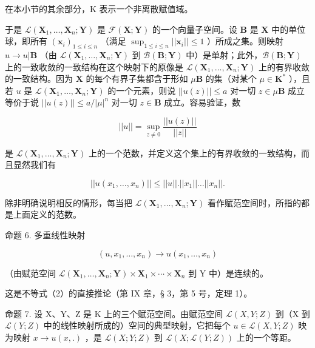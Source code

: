 在本小节的其余部分，K 表示一个非离散赋值域。

于是 \(\mathcal{L}(\mathbf{X}_1, \ldots, \mathbf{X}_n; \mathbf{Y})\) 是 \(\mathcal{F}(\mathbf{X}; \mathbf{Y})\) 的一个向量子空间。设 \(\mathbf{B}\) 是 \(\mathbf{X}\) 中的单位球，即所有 \((\boldsymbol{x}_i)_{1 \leqslant i \leqslant n}\) （满足 \(\sup_{1 \leqslant i \leqslant n} ||\boldsymbol{x}_i|| \leqslant 1\) ）所成之集。则映射 \(u \to u|\mathbf{B}\) （由 \(\mathcal{L}(\mathbf{X}_1, \ldots, \mathbf{X}_n; \mathbf{Y})\) 到 \(\mathcal{B}(\mathbf{B}; \mathbf{Y})\) 中）是单射；此外，\(\mathcal{B}(\mathbf{B}; \mathbf{Y})\) 上的一致收敛的一致结构在这个映射下的原像是 \(\mathcal{L}(\mathbf{X}_1, \ldots, \mathbf{X}_n; \mathbf{Y})\) 上的有界收敛的一致结构。因为 \(\mathbf{X}\) 的每个有界子集都含于形如 \(\mu\mathbf{B}\) 的集（对某个 \(\mu \in \mathbf{K}^*\) ），且若 \(u\) 是 \(\mathcal{L}(\mathbf{X}_1, \ldots, \mathbf{X}_n; \mathbf{Y})\) 的一个元素，则说 \(||u(z)|| \leqslant a\) 对一切 \(z \in \mu\mathbf{B}\) 成立等价于说 \(||u(z)|| \leqslant a/|\mu|^n\) 对一切 \(z \in \mathbf{B}\) 成立。容易验证，数

\[
\left| \left| u \right| \right| = \sup _ {z \neq 0} \frac {\left| \left| u (z) \right| \right|}{\left| \left| z \right| \right|}
\]

是 \(\mathcal{L}(\mathbf{X}_1, \ldots, \mathbf{X}_n; \mathbf{Y})\) 上的一个范数，并定义这个集上的有界收敛的一致结构，而且显然我们有

\[
\left| \left| u \left(x _ {1}, \dots , x _ {n}\right) \right| \right| \leqslant \left| \left| u \right| \right|. \left| \left| x _ {1} \right| \right| \dots \left| \left| x _ {n} \right| \right|.\tag{2}
\]

除非明确说明相反的情形，每当把 \(\mathcal{L}(\mathbf{X}_1,\ldots ,\mathbf{X}_n;\mathbf{Y})\) 看作赋范空间时，所指的都是上面定义的范数。

命题 6. 多重线性映射

\[
(u, x _ {1}, \dots , x _ {n}) \rightarrow u (x _ {1}, \dots , x _ {n})
\]

（由赋范空间 \(\mathcal{L}(\mathbf{X}_{1},\ldots,\mathbf{X}_{n};\mathbf{Y})\times\mathbf{X}_{1}\times\cdots\times\mathbf{X}_{n}\) 到 Y 中）是连续的。

这是不等式（2）的直接推论（第 IX 章，§ 3，第 5 号，定理 1）。

命题 7. 设 X、Y、Z 是 K 上的三个赋范空间。由赋范空间 \(\mathscr{L}(X, Y; Z)\) 到（X 到 \(\mathscr{L}(Y; Z)\) 中的线性映射所成的）空间的典型映射，它把每个 \(u \in \mathscr{L}(X, Y; Z)\) 映为映射 \(x \to u(x, .)\) ，是 \(\mathscr{L}(X; Y; Z)\) 到 \(\mathscr{L}(X; \mathscr{L}(Y; Z))\) 上的一个等距。

